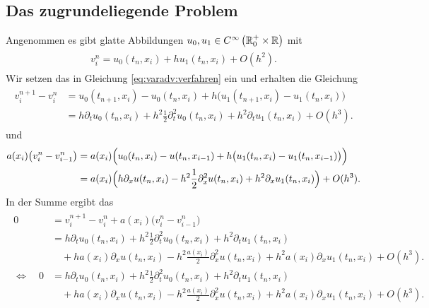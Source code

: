 
\subsection*{Das zugrundeliegende Problem}

Angenommen es gibt glatte Abbildungen $u_0, u_1 \in C^{\infty}\left( \mathbb R^+_0 \times \mathbb R \right)$ mit
\begin{align}\label{eq:varadv:reg:ansatz}
\begin{split}
v^n_i = u_0(t_n, x_i) + h u_1(t_n, x_i) + O(h^2).
\end{split}
\end{align}
Wir setzen das in Gleichung \eqref{eq:varadv:verfahren} ein und erhalten die Gleichung
\begin{align}
\begin{split}
v^{n+1}_i - v^n_i &= u_0(t_{n+1}, x_i) - u_0(t_n, x_i) + h \bigl( u_1(t_{n+1}, x_i) - u_1(t_n, x_i) \bigr)\\
&= h \partial_t u_0(t_n, x_i) + h^2 \frac{1}{2} \partial^2_t u_0(t_n, x_i) + h^2  \partial_t u_1(t_n, x_i) + O(h^3).
\end{split}
\end{align}
und
\begin{align}
\begin{split}
a(x_i) \bigl( v^n_i - v^n_{i-1} \bigr) &= a(x_i) \Bigl( u_0(t_n, x_i) - u(t_n, x_{i-1}) + h \bigl( u_1(t_n, x_i) - u_1(t_n, x_{i-1}) \bigr) \Bigr)\\
&= a(x_i)  \Bigl( h \partial_x u(t_n, x_i) - h^2 \frac{1}{2} \partial^2_x u(t_n, x_i) + h^2 \partial_x u_1(t_n, x_i) \Bigr) + O(h^3).
\end{split}
\end{align}
In der Summe ergibt das
\begin{align}
\begin{split}
0 &= v^{n+1}_i - v^n_i + a(x_i)  \bigl( v^n_i - v^n_{i-1} \bigr)\\
&=  h \partial_t u_0(t_n, x_i) + h^2 \frac{1}{2} \partial^2_t u_0(t_n, x_i) + h^2  \partial_t u_1(t_n, x_i)\\
&\quad + h a(x_i)  \partial_x u(t_n, x_i) - h^2 \frac{a(x_i) }{2} \partial^2_x u(t_n, x_i) + h^2 a(x_i)  \partial_x u_1(t_n, x_i) + O(h^3).\\
\Leftrightarrow \quad 0 &= h \partial_t u_0(t_n, x_i) + h^2 \frac{1}{2} \partial^2_t u_0(t_n, x_i) + h^2 \partial_t u_1(t_n, x_i)\\
&\quad + h a(x_i) \partial_x u(t_n, x_i) - h^2 \frac{a(x_i)}{2} \partial^2_x u(t_n, x_i) + h^2 a(x_i) \partial_x u_1(t_n, x_i) + O(h^3).
\end{split}
\end{align}
